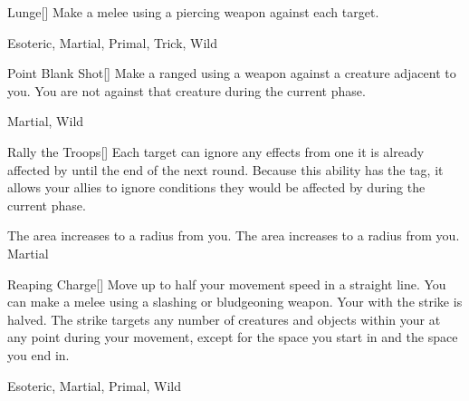 \lowercase{\hypertarget{maneuver:Lunge}{}}\label{maneuver:Lunge}
\hypertarget{maneuver:Lunge}{}
\begin{freeability}[Rank 2]{Lunge}[]
Make a melee  using a piercing weapon against each target.


 Esoteric, Martial, Primal, Trick, Wild
\end{freeability}
\vspace{0.25em}



\lowercase{\hypertarget{maneuver:Point Blank Shot}{}}\label{maneuver:Point Blank Shot}
\hypertarget{maneuver:Point Blank Shot}{}
\begin{freeability}[Rank 2]{Point Blank Shot}[]
Make a ranged  using a  weapon against a creature adjacent to you.
You are not  against that creature during the current phase.


 Martial, Wild
\end{freeability}
\vspace{0.25em}



\lowercase{\hypertarget{maneuver:Rally the Troops}{}}\label{maneuver:Rally the Troops}
\hypertarget{maneuver:Rally the Troops}{}
\begin{freeability}[Rank 2]{Rally the Troops}[]
Each target can ignore any effects from one  it is already affected by until the end of the next round.
Because this ability has the  tag, it allows your allies to ignore conditions they would be affected by during the current phase.

\rankline
{} The area increases to a \arealarge radius from you.
 The area increases to a \areahuge radius from you.
 Martial
\end{freeability}
\vspace{0.25em}



\lowercase{\hypertarget{maneuver:Reaping Charge}{}}\label{maneuver:Reaping Charge}
\hypertarget{maneuver:Reaping Charge}{}
\begin{freeability}[Rank 2]{Reaping Charge}[]
Move up to half your movement speed in a straight line.
You can make a melee  using a slashing or bludgeoning weapon.
Your  with the strike is halved.
The strike targets any number of creatures and objects within your  at any point during your movement, except for the space you start in and the space you end in.


 Esoteric, Martial, Primal, Wild
\end{freeability}
\vspace{0.25em}




